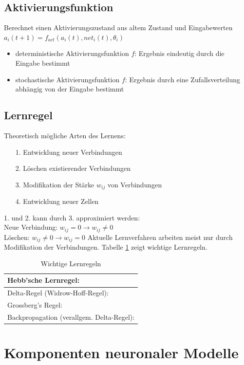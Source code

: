 \subsection{Aktivierungsfunktion}
Berechnet einen Aktivierungszustand aus altem Zustand und Eingabewerten\\
$a_i(t+1) = f_{act}(a_i(t), net_i(t), \theta_i)$
\begin{itemize}
\item deterministische Aktivierungsfunktion $f$: Ergebnis eindeutig durch die Eingabe bestimmt
\item stochastische Aktivierungsfunktion $f$: Ergebnis durch eine Zufallsverteilung abhängig von der Eingabe bestimmt
\end{itemize}

\subsection{Lernregel}

Theoretisch mögliche Arten des Lernens:
\begin{itemize}
\item[1.]Entwicklung neuer Verbindungen
\item[2.]Löschen existierender Verbindungen
\item[3.]Modifikation der Stärke $w_{ij}$ von Verbindungen
\item[4.]Entwicklung neuer Zellen
\end{itemize}
1. und 2. kann durch 3. approximiert werden:\\
Neue Verbindung: $w_{ij} = 0 \rightarrow w_{ij} \neq 0$\\
Löschen: $w_{ij} \neq 0 \rightarrow w_{ij} = 0$
Aktuelle Lernverfahren arbeiten meist nur durch Modifikation der Verbindungen.
Tabelle \ref{tab:lernregeln} zeigt wichtige Lernregeln.
\begin{table}
\centering
\begin{tabular}{|l|}
	\hline
	Hebb'sche Lernregel: \\
	\hline
	Delta-Regel (Widrow-Hoff-Regel):\\
	\hline
	Grossberg's Regel:\\
	\hline
	Backpropagation (verallgem. Delta-Regel):\\
	\hline
\end{tabular}
\caption{Wichtige Lernregeln}
\label{tab:lernregeln}
\end{table}

\section*{Komponenten neuronaler Modelle}
